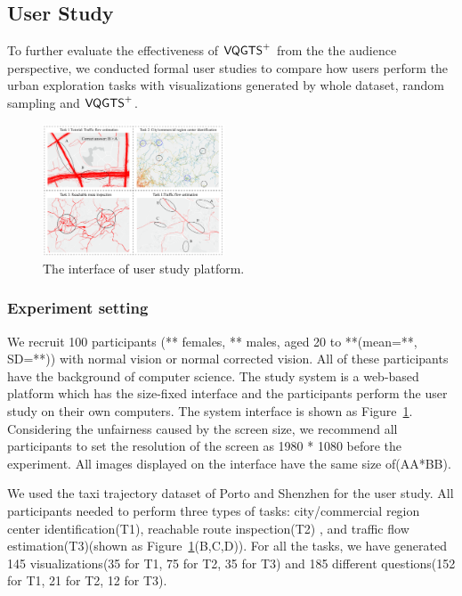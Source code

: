 \subsection{User Study}
To further evaluate the effectiveness of $\mathsf{VQGTS}^{+}$ from the the audience perspective, we conducted formal user studies to compare how users perform the urban exploration tasks with visualizations generated by whole dataset, random sampling and $\mathsf{VQGTS}^{+}$.


\begin{figure}[t]
	\centering
	\includegraphics[width=0.48\textwidth]{pictures/user_study/interface.pdf}
	\vspace{-3mm}
	\caption{The interface of user study platform.}
	\vspace{-5mm}
	\label{fig:user_study}
\end{figure}

\subsubsection{Experiment setting}

We recruit 100 participants (** females, ** males, aged 20 to **(mean=**, SD=**)) with normal vision or normal corrected vision. All of these participants have the background of computer science. 
The study system is a web-based platform which has the size-fixed interface and the participants perform the user study on their own  computers. The system interface is shown as Figure~\ref{fig:user_study}. Considering the unfairness caused by the screen size, we recommend all participants to set the resolution of the screen as 1980 * 1080 before the experiment. All images displayed on the interface have the same size of(AA*BB).  

We used the taxi trajectory dataset of Porto and Shenzhen for the user study. All participants needed to perform three types of tasks:  city/commercial region center identification(T1), reachable route inspection(T2) , and traffic flow estimation(T3)(shown as Figure~\ref{fig:user_study}(B,C,D)). For all the tasks, we have generated 145 visualizations(35 for T1, 75 for T2, 35 for T3) and 185 different questions(152 for T1, 21 for T2, 12 for T3). 




